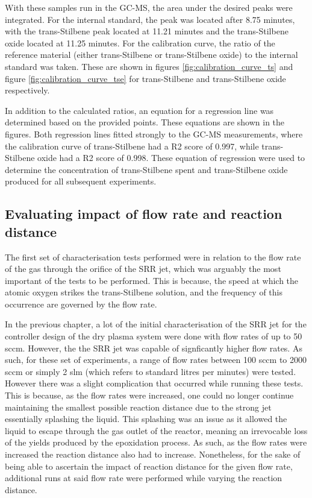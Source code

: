 With these samples run in the GC-MS, the area under the desired peaks were integrated. For the internal standard, the peak was located after 8.75 minutes, with the trans-Stilbene peak located at 11.21 minutes and the trans-Stilbene oxide located at 11.25 minutes. For the calibration curve, the ratio of the reference material (either trans-Stilbene or trans-Stilbene oxide) to the internal standard was taken. These are shown in figures \ref{fig:calibration_curve_ts} and figure \ref{fig:calibration_curve_tse} for  trans-Stilbene and trans-Stilbene oxide respectively.

In addition to the calculated ratios, an equation for a regression line was determined based on the provided points. These equations are shown in the figures. Both regression lines fitted strongly to the GC-MS measurements, where the calibration curve of trans-Stilbene had a R2 score of 0.997, while trans-Stilbene oxide had a R2 score of 0.998. These equation of regression were used to determine the concentration of trans-Stilbene spent and trans-Stilbene oxide produced for all subsequent experiments.

\subsection{Evaluating impact of flow rate and reaction distance}

The first set of characterisation tests performed were in relation to the flow rate of the gas through the orifice of the SRR jet, which was arguably the most important of the tests to be performed. This is because, the speed at which the atomic oxygen strikes the trans-Stilbene solution, and the frequency of this occurrence are governed by the flow rate. 

In the previous chapter, a lot of the initial characterisation of the SRR jet for the controller design of the dry plasma system were done with flow rates of up to 50 sccm. However, the the SRR jet was capable of signficantly higher flow rates. As such, for these set of experiments, a range of flow rates between 100 sccm to 2000 sccm or simply 2 slm (which refers to standard litres per minutes) were tested. However there was a slight complication that occurred while running these tests. This is because, as the flow rates were increased, one could no longer continue maintaining the smallest possible reaction distance due to the strong jet essentially splashing the liquid. This splashing was an issue as it allowed the liquid to escape through the gas outlet of the reactor, meaning an irrevocable loss of the yields produced by the epoxidation process. As such, as the flow rates were increased the reaction distance also had to increase. Nonetheless, for the sake of being able to ascertain the impact of reaction distance for the given flow rate, additional runs at said flow rate were performed while varying the reaction distance. 

